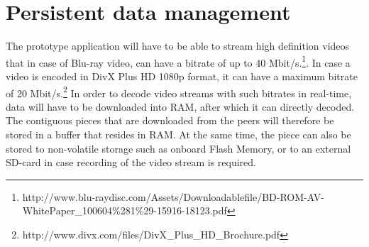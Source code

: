 \section{Persistent data management}
\label{sec:perdata}
The prototype application will have to be able to stream high definition videos that in case of Blu-ray video, can have a bitrate of up to 40 Mbit/s.\footnote{http://www.blu-raydisc.com/Assets/Downloadablefile/BD-ROM-AV-WhitePaper_100604\%281\%29-15916-18123.pdf}. In case a video is encoded in DivX Plus HD 1080p format, it can have a maximum bitrate of 20 Mbit/s.\footnote{http://www.divx.com/files/DivX_Plus_HD_Brochure.pdf} In order to decode video streams with such bitrates in real-time, data will have to be downloaded into RAM, after which it can directly decoded. The contiguous pieces that are downloaded from the peers will therefore be stored in a buffer that resides in RAM. At the same time, the piece can also be stored to non-volatile storage such as onboard Flash Memory, or to an external SD-card in case recording of the video stream is required.
